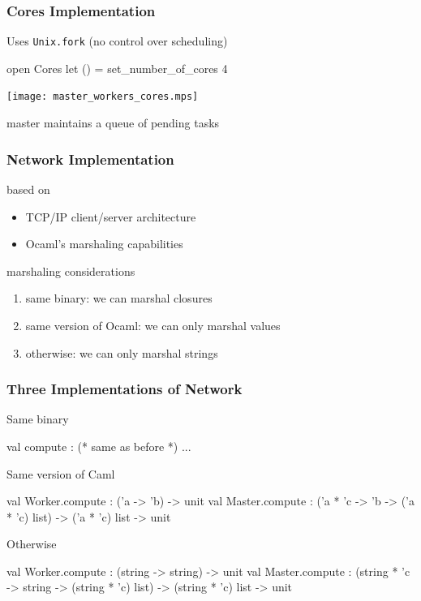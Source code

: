 \documentclass[xcolor=dvipsnames]{beamer}
\let\emph\alert
\begin{document}


\begin{frame}\frametitle {Cores Implementation}
  Uses \texttt{Unix.fork} (no control over scheduling)

  \begin{ocaml}
  open Cores
  let () = set_number_of_cores 4
  \end{ocaml}

  \begin{center}
    \texttt{[image: master\_workers\_cores.mps]}
  \end{center}

  master maintains a queue of pending tasks
  
\end{frame}



\begin{frame}\frametitle {Network Implementation}
  based on
  \begin{itemize}
  \item TCP/IP client/server architecture
  \item Ocaml's marshaling capabilities
  \end{itemize}
  
  \vfill
  marshaling considerations
  \begin{enumerate}
  \item \emph{same binary}: we can marshal closures
  \item \emph{same version of Ocaml}: we can only marshal values
  \item \emph{otherwise}: we can only marshal strings
  \end{enumerate}
  
\end{frame}


\begin{frame}\frametitle {Three Implementations of Network}
  
\emph{Same binary}
\begin{ocaml}
val compute : (* same as before *) ...
\end{ocaml}



\emph{Same version of Caml}
    \begin{ocaml}
val Worker.compute : ('a -> 'b) -> unit
val Master.compute : 
  ('a * 'c -> 'b -> ('a * 'c) list) ->
  ('a * 'c) list -> unit
\end{ocaml}



\emph{Otherwise}
    \begin{ocaml}
val Worker.compute : (string -> string) -> unit
val Master.compute : 
  (string * 'c -> string -> (string * 'c) list) ->
  (string * 'c) list -> unit
\end{ocaml}

\end{frame}
\end{document}
